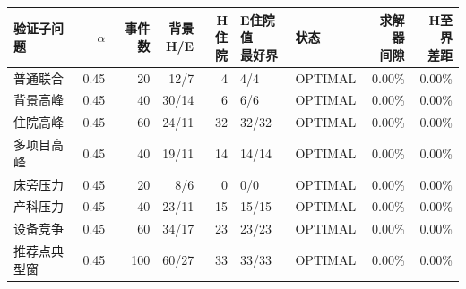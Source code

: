 \begingroup
\setlength{\tabcolsep}{3pt}
\begin{tabularx}{\textwidth}{>{\raggedright\arraybackslash}Xrrrrllrr}
\toprule
验证子问题 & $\alpha$ & 事件数 & \makecell{背景\\H/E} & \makecell{H\\住院} & \makecell{E住院值\\最好界} & 状态 & \makecell{求解器\\间隙} & \makecell{H至界\\差距} \\
\midrule
普通联合 & 0.45 & 20 & 12/7 & 4 & 4/4 & OPTIMAL & 0.00\% & 0.00\% \\
背景高峰 & 0.45 & 40 & 30/14 & 6 & 6/6 & OPTIMAL & 0.00\% & 0.00\% \\
住院高峰 & 0.45 & 60 & 24/11 & 32 & 32/32 & OPTIMAL & 0.00\% & 0.00\% \\
多项目高峰 & 0.45 & 40 & 19/11 & 14 & 14/14 & OPTIMAL & 0.00\% & 0.00\% \\
床旁压力 & 0.45 & 20 & 8/6 & 0 & 0/0 & OPTIMAL & 0.00\% & 0.00\% \\
产科压力 & 0.45 & 40 & 23/11 & 15 & 15/15 & OPTIMAL & 0.00\% & 0.00\% \\
设备竞争 & 0.45 & 60 & 34/17 & 23 & 23/23 & OPTIMAL & 0.00\% & 0.00\% \\
推荐点典型窗 & 0.45 & 100 & 60/27 & 33 & 33/33 & OPTIMAL & 0.00\% & 0.00\% \\
\bottomrule
\end{tabularx}
\endgroup
